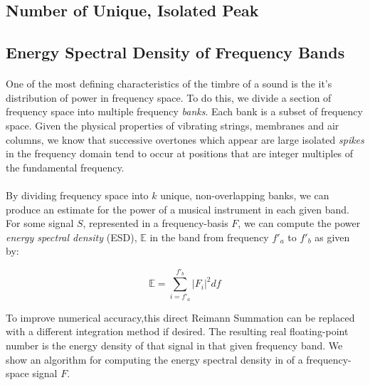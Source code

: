 \documentclass[12pt,letterpaper]{article}
\begin{document}

\subsection{Number of Unique, Isolated Peak}


\subsection{Energy Spectral Density of Frequency Bands}

\paragraph*{}One of the most defining characteristics of the timbre of a sound is the it's distribution of power in frequency space. To do this, we divide a section of frequency space into multiple frequency \textit{banks}. Each bank is a subset of frequency space. Given the physical properties of vibrating strings, membranes and air columns, we know that successive overtones which appear are large isolated \textit{spikes} in the frequency domain tend to occur at positions that are integer multiples of the fundamental frequency.

\paragraph*{}By dividing frequency space into $k$ unique, non-overlapping banks, we can produce an estimate for the power of a musical instrument in each given band. For some signal $S$, represented in a frequency-basis $F$, we can compute the power \textit{energy spectral density} (ESD), $\mathbb{E}$ in the band from frequency $f'_a$ to $f'_b$ as given by:

\begin{equation}
\mathbb{E} = \sum_{i=f'_a}^{f'_b} |F_i|^2 df
\end{equation}

To improve numerical accuracy,this direct Reimann Summation can be replaced with a different integration method if desired. The resulting real floating-point number is the energy density of that signal in that given frequency band. We show an algorithm for computing the energy spectral density in of a frequency-space signal $F$.
\end{document}
